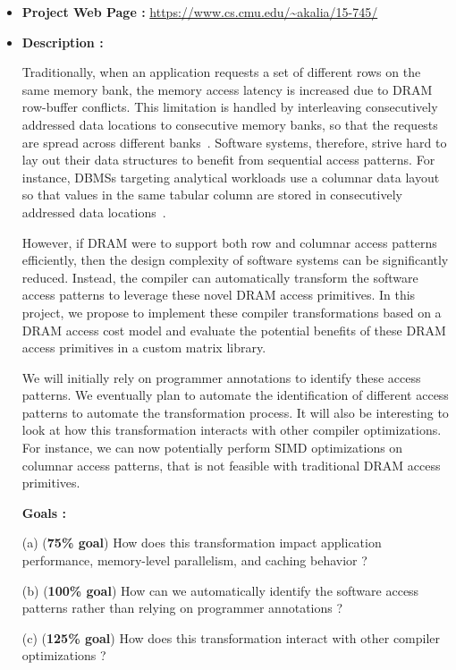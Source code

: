\documentclass[letterpaper]{article}
\begin{document}
\begin{itemize}

\item \textbf{Project Web Page :} \url{https://www.cs.cmu.edu/~akalia/15-745/}

\item \textbf{Description :} 

Traditionally, when an application requests a set of different rows 
on the same memory bank, the memory access latency is increased due
to DRAM row-buffer conflicts.
This limitation is handled by interleaving consecutively 
addressed data locations to consecutive memory banks, so that
the requests are spread across different banks~\cite{dram1}.
Software systems, therefore, strive hard to lay out their data structures 
to benefit from sequential access patterns. 
For instance, DBMSs targeting analytical workloads use a columnar data 
layout so that values in the same tabular column are stored in
consecutively addressed data locations~\cite{col1}.

However, if DRAM were to support both row and columnar access patterns
efficiently, then the design complexity of software systems can be significantly 
reduced. Instead, the compiler can automatically transform the software access
patterns to leverage these novel DRAM access primitives. 
In this project, we propose to implement these compiler transformations based
on a DRAM access cost model and evaluate the potential benefits of these DRAM
access primitives in a custom matrix library. 

We will initially rely on programmer annotations to identify these access
patterns.
We eventually plan to automate the identification of different access patterns
to automate the transformation process.
It will also be interesting to look at how this transformation interacts with
other compiler optimizations. For instance, we can now potentially perform
SIMD optimizations on columnar access patterns, that is not feasible with
traditional DRAM access primitives.

\textbf{Goals :}

(a) (\textbf{75\% goal}) How does this transformation impact application
performance, memory-level parallelism, and caching behavior ? 

(b) (\textbf{100\% goal}) How can we automatically identify the software access
patterns rather than relying on programmer annotations ?

(c) (\textbf{125\% goal}) How does this transformation interact with other
compiler optimizations ?

\end{itemize}
\end{document}
